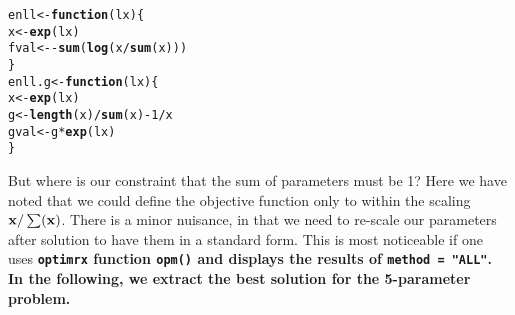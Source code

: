 \documentclass[11pt]{article}\usepackage[]{graphicx}\usepackage[]{color}
\makeatletter
\newcommand{\hlnum}[1]{\textcolor[rgb]{0.686,0.059,0.569}{#1}}%
\newcommand{\hlopt}[1]{\textcolor[rgb]{0,0,0}{#1}}%
\newcommand{\hlstd}[1]{\textcolor[rgb]{0.345,0.345,0.345}{#1}}%
\newcommand{\hlkwa}[1]{\textcolor[rgb]{0.161,0.373,0.58}{\textbf{#1}}}%
\newcommand{\hlkwb}[1]{\textcolor[rgb]{0.69,0.353,0.396}{#1}}%
\newcommand{\hlkwc}[1]{\textcolor[rgb]{0.333,0.667,0.333}{#1}}%
\newcommand{\hlkwd}[1]{\textcolor[rgb]{0.737,0.353,0.396}{\textbf{#1}}}%
\newenvironment{kframe}{%
 \def\at@end@of@kframe{}%
 \ifinner\ifhmode%
  \def\at@end@of@kframe{\end{minipage}}%
  \begin{minipage}{\columnwidth}%
 \fi\fi%
 \def\FrameCommand##1{\hskip\@totalleftmargin \hskip-\fboxsep
 \colorbox{shadecolor}{##1}\hskip-\fboxsep
     \hskip-\linewidth \hskip-\@totalleftmargin \hskip\columnwidth}%
 \MakeFramed {\advance\hsize-\width
   \@totalleftmargin\z@ \linewidth\hsize
   \@setminipage}}%
 {\par\unskip\endMakeFramed%
 \at@end@of@kframe}
\newenvironment{knitrout}{}{} %
\newcommand{\B}[1]{{\bf #1 \rm}}
\newcommand{\code}[1]{{\tt#1}}
\newcommand{\pkg}[1]{\bf{\tt#1}\rm }
\makeatother
\begin{document}
\begin{knitrout}\scriptsize
{}\color{fgcolor}\begin{kframe}
\begin{alltt}
\hlstd{enll} \hlkwb{<-} \hlkwa{function}\hlstd{(}\hlkwc{lx}\hlstd{) \{}
    \hlstd{x}\hlkwb{<-}\hlkwd{exp}\hlstd{(lx)}
    \hlstd{fval}\hlkwb{<-}  \hlopt{-} \hlkwd{sum}\hlstd{(} \hlkwd{log}\hlstd{( x}\hlopt{/}\hlkwd{sum}\hlstd{(x) ) )}
\hlstd{\}}
\hlstd{enll.g} \hlkwb{<-} \hlkwa{function}\hlstd{(}\hlkwc{lx}\hlstd{)\{}
    \hlstd{x}\hlkwb{<-}\hlkwd{exp}\hlstd{(lx)}
    \hlstd{g}\hlkwb{<-}\hlkwd{length}\hlstd{(x)}\hlopt{/}\hlkwd{sum}\hlstd{(x)} \hlopt{-} \hlnum{1}\hlopt{/}\hlstd{x}
    \hlstd{gval}\hlkwb{<-}\hlstd{g}\hlopt{*}\hlkwd{exp}\hlstd{(lx)}
\hlstd{\}}
\end{alltt}
\end{kframe}
\end{knitrout}

But where is our constraint that the sum of parameters must be 1? 
Here we have noted that we could define the objective 
function only to within the scaling  $\B{x}/\sum(\B{x})$. There is a minor 
nuisance, in that we need to re-scale our 
parameters after solution to have them in a standard form. 
This is most noticeable if one uses \pkg{optimrx} function \code{opm()}
and displays the results of \code{method = "ALL"}. In the following, we
extract the best solution for the 5-parameter problem.
\end{document}
